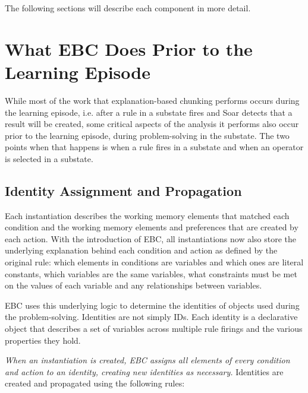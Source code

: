 The following sections will describe each component in more detail.


\section{What EBC Does Prior to the Learning Episode}
\label{CHUNKING-prior}

While most of the work that explanation-based chunking performs occurs during the learning episode, i.e. after a rule in a substate fires and Soar detects that a result will be created, some critical aspects of the analysis it performs also occur prior to the learning episode, during problem-solving in the substate.  The two points when that happens is when a rule fires in a substate and when an operator is selected in a substate.

\subsection{Identity Assignment and Propagation}
\label{CHUNKING-prior-identities}

Each instantiation describes the working memory elements that matched each condition and the working memory elements and preferences that are created by each action.  With the introduction of EBC, all instantiations now also store the underlying explanation behind each condition and action as defined by the original rule: which elements in conditions are variables and which ones are literal constants, which variables are the same variables, what constraints must be met on the values of each variable and any relationships between variables.

EBC uses this underlying logic to determine the identities of objects used during the problem-solving.  Identities are not simply IDs.  Each identity is a declarative object that describes a set of variables across multiple rule firings and the various properties they hold.

\emph{When an instantiation is created, EBC assigns all elements of every condition and action to an identity, creating new identities as necessary.} Identities are created and propagated using the following rules:


